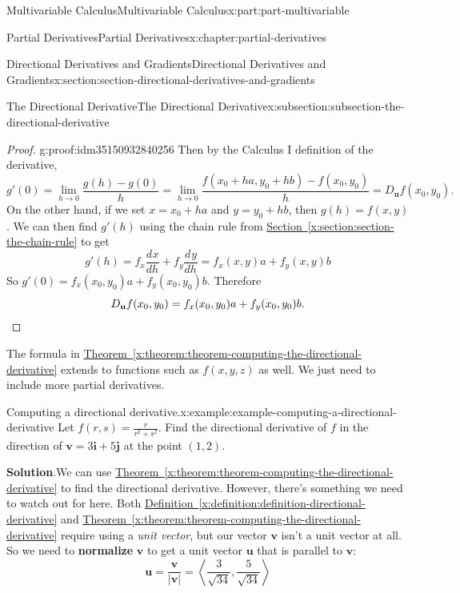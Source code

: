 \documentclass[twoside,10pt,]{book}
\newcommand{\blocktitlefont}{\relax}
\newcommand{\xreffont}{\relax}
\newcommand{\terminology}[1]{\textbf{#1}}
\numberwithin{equation}{part}
\newcommand{\qedhere}{\relax}
\newcommand{\vb}[1]{\mathbf{#1}}
\newcommand{\dv}[3][]{\dfrac{d^{#1} #2}{d #3^{#1}}}
\newcommand{\dotprod}[1]{\left\langle #1 \right\rangle}
\begin{document}
\begin{partptx}{Multivariable Calculus}{}{Multivariable Calculus}{}{}{x:part:part-multivariable}
\begin{chapterptx}{Partial Derivatives}{}{Partial Derivatives}{}{}{x:chapter:partial-derivatives}
\begin{sectionptx}{Directional Derivatives and Gradients}{}{Directional Derivatives and Gradients}{}{}{x:section:section-directional-derivatives-and-gradients}
\begin{subsectionptx}{The Directional Derivative}{}{The Directional Derivative}{}{}{x:subsection:subsection-the-directional-derivative}
\begin{proof}{}{g:proof:idm35150932840256}
Then by the Calculus I definition of the derivative,%
\begin{equation*}
g'(0) = \lim_{h\to0}\frac{g(h) - g(0)}{h} = \lim_{h\to0}\frac{f(x_{0}+ha, y_{0}+hb) - f(x_{0},y_{0})}{h} = D_{\vb{u}}f(x_{0},y_{0}).
\end{equation*}
On the other hand, if we set \(x = x_{0} + ha\) and \(y = y_{0} + hb\), then \(g(h) = f(x,y)\). We can then find \(g'(h)\) using the chain rule from \hyperref[x:section:section-the-chain-rule]{Section~{\xreffont\ref{x:section:section-the-chain-rule}}} to get%
\begin{equation*}
g'(h) = f_{x}\dv{x}{h} + f_{y}\dv{y}{h} = f_{x}(x,y)a + f_{y}(x,y)b
\end{equation*}
So \(g'(0) = f_{x}(x_{0},y_{0})a + f_{y}(x_{0},y_{0})b.\) Therefore%
\begin{equation*}
D_{\vb{u}}f(x_{0},y_{0}) = f_{x}(x_{0},y_{0})a + f_{y}(x_{0},y_{0})b.\qedhere
\end{equation*}
%
\end{proof}
The formula in \hyperref[x:theorem:theorem-computing-the-directional-derivative]{Theorem~{\xreffont\ref{x:theorem:theorem-computing-the-directional-derivative}}} extends to functions such as \(f(x,y,z)\) as well. We just need to include more partial derivatives.%
\begin{example}{Computing a directional derivative.}{x:example:example-computing-a-directional-derivative}%
Let \(f(r,s) = \frac{r}{r^{2}+s^{2}}\). Find the directional derivative of \(f\) in the direction of \(\vb{v} = 3\vb{i} + 5\vb{j}\) at the point \((1,2)\).%
\par\smallskip%
\noindent\textbf{\blocktitlefont Solution}.\hypertarget{g:solution:idm35150932635584}{}\quad{}We can use \hyperref[x:theorem:theorem-computing-the-directional-derivative]{Theorem~{\xreffont\ref{x:theorem:theorem-computing-the-directional-derivative}}} to find the directional derivative. However, there's something we need to watch out for here. Both \hyperref[x:definition:definition-directional-derivative]{Definition~{\xreffont\ref{x:definition:definition-directional-derivative}}} and \hyperref[x:theorem:theorem-computing-the-directional-derivative]{Theorem~{\xreffont\ref{x:theorem:theorem-computing-the-directional-derivative}}} require using a \emph{unit vector}, but our vector \(\vb{v}\) isn't a unit vector at all. So we need to \terminology{normalize} \(\vb{v}\) to get a unit vector \(\vb{u}\) that is parallel to \(\vb{v}\):%
\begin{equation*}
\vb{u} = \frac{\vb{v}}{|\vb{v}|} = \dotprod{\frac{3}{\sqrt{34}}, \frac{5}{\sqrt{34}}}

\end{equation*}
\end{example}
\end{subsectionptx}
\end{sectionptx}
\end{chapterptx}
\end{partptx}
\end{document}
